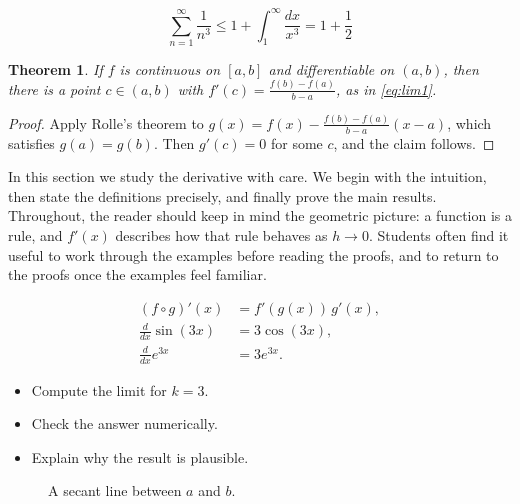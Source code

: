 \documentclass[11pt]{article}
\newtheorem{theorem}{Theorem}[section]
\begin{document}
\[
  \sum_{n=1}^{\infty} \frac{1}{n^{3}} \le 1 + \int_1^{\infty} \frac{dx}{x^{3}} = 1 + \frac{1}{2}
\]

\begin{theorem}
If $f$ is continuous on $[a,b]$ and differentiable on $(a,b)$, then there is a point $c \in (a,b)$ with $f'(c) = \frac{f(b)-f(a)}{b-a}$, as in \eqref{eq:lim1}.
\end{theorem}

\begin{proof}
Apply Rolle's theorem to $g(x) = f(x) - \frac{f(b)-f(a)}{b-a}(x-a)$, which satisfies $g(a) = g(b)$. Then $g'(c) = 0$ for some $c$, and the claim follows.
\end{proof}

In this section we study the derivative with care. We begin with the intuition, then state the definitions precisely, and finally prove the main results. Throughout, the reader should keep in mind the geometric picture: a function is a rule, and $f'(x)$ describes how that rule behaves as $h \to 0$. Students often find it useful to work through the examples before reading the proofs, and to return to the proofs once the examples feel familiar. 

\begin{align*}
  (f \circ g)'(x) &= f'(g(x))\, g'(x), \\
  \frac{d}{dx} \sin(3 x) &= 3 \cos(3 x), \\
  \frac{d}{dx} e^{3 x} &= 3 e^{3 x}.
\end{align*}

\begin{itemize}
  \item Compute the limit for $k = 3$.
  \item Check the answer numerically.
  \item Explain why the result is plausible.
\end{itemize}

\begin{figure}[ht]
  \centering
  \caption{A secant line between $a$ and $b$.}
\end{figure}
\end{document}
